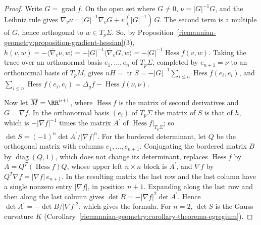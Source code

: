 \begin{proof}
Write $G = \operatorname{grad}f$. On the open set where $G \neq 0$, $\nu = |G|^{-1}G$, and the Leibniz rule gives $\overline{\nabla}_v\nu = |G|^{-1}\overline{\nabla}_vG + v(|G|^{-1})\,G$. The second term is a
multiple of $G$, hence orthogonal to $w \in T_p\Sigma$. So, by Proposition~\ref{riemannian-geometry:proposition-gradient-hessian}(3),
$h(v, w) = -\langle\overline{\nabla}_v\nu, w\rangle = -|G|^{-1}\langle\overline{\nabla}_vG, w\rangle = -|G|^{-1}\operatorname{Hess}f(v, w)$. Taking the trace over an orthonormal basis $e_1, \ldots, e_n$ of $T_p\Sigma$,
completed by $e_{n+1} = \nu$ to an orthonormal basis of $T_p\overline{M}$, gives $nH = \operatorname{tr}S = -|G|^{-1}\sum_{i \leq n}\operatorname{Hess}f(e_i, e_i)$, and
$\sum_{i \leq n}\operatorname{Hess}f(e_i, e_i) = \Delta_gf - \operatorname{Hess}f(\nu, \nu)$.

Now let $\overline{M} = \RR^{n+1}$, where $\operatorname{Hess}f$ is the matrix of second derivatives and $G = \nabla f$. In the orthonormal basis $(e_i)$ of $T_p\Sigma$ the matrix of $S$ is that of $h$, which is
$-|\nabla f|^{-1}$ times the matrix $A^{\prime}$ of $\operatorname{Hess}f|_{T_p\Sigma}$; so $\det S = (-1)^n\det A^{\prime}/|\nabla f|^n$. For the bordered determinant, let $Q$ be the orthogonal matrix with
columns $e_1, \ldots, e_{n+1}$. Conjugating the bordered matrix $B$ by $\operatorname{diag}(Q, 1)$, which does not change its determinant, replaces $\operatorname{Hess}f$ by $A = Q^T(\operatorname{Hess}f)Q$, whose upper left
$n \times n$ block is $A^{\prime}$, and $\nabla f$ by $Q^T\nabla f = |\nabla f|\,e_{n+1}$. In the resulting matrix the last row and the last column have a single nonzero entry $|\nabla f|$, in position
$n + 1$. Expanding along the last row and then along the last column gives $\det B = -|\nabla f|^2\det A^{\prime}$. Hence $\det A^{\prime} = -\det B/|\nabla f|^2$, which gives the formula. For $n = 2$, $\det S$
is the Gauss curvature $K$ (Corollary~\ref{riemannian-geometry:corollary-theorema-egregium}).
\end{proof}

